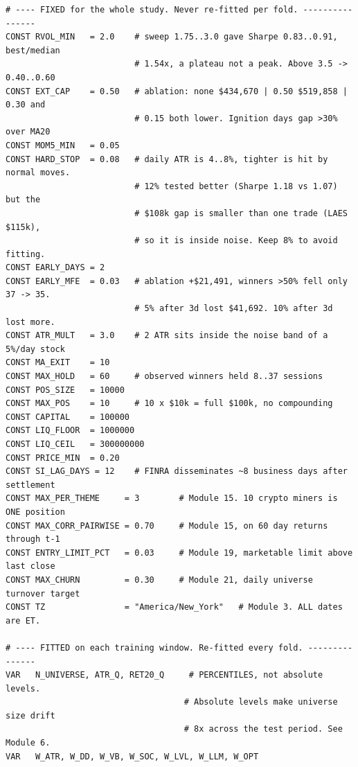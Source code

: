 \documentclass[10pt]{article}
\begin{document}
\begin{lstlisting}
# ---- FIXED for the whole study. Never re-fitted per fold. ----------------
CONST RVOL_MIN   = 2.0    # sweep 1.75..3.0 gave Sharpe 0.83..0.91, best/median
                          # 1.54x, a plateau not a peak. Above 3.5 -> 0.40..0.60
CONST EXT_CAP    = 0.50   # ablation: none $434,670 | 0.50 $519,858 | 0.30 and
                          # 0.15 both lower. Ignition days gap >30% over MA20
CONST MOM5_MIN   = 0.05
CONST HARD_STOP  = 0.08   # daily ATR is 4..8%, tighter is hit by normal moves.
                          # 12% tested better (Sharpe 1.18 vs 1.07) but the
                          # $108k gap is smaller than one trade (LAES $115k),
                          # so it is inside noise. Keep 8% to avoid fitting.
CONST EARLY_DAYS = 2
CONST EARLY_MFE  = 0.03   # ablation +$21,491, winners >50% fell only 37 -> 35.
                          # 5% after 3d lost $41,692. 10% after 3d lost more.
CONST ATR_MULT   = 3.0    # 2 ATR sits inside the noise band of a 5%/day stock
CONST MA_EXIT    = 10
CONST MAX_HOLD   = 60     # observed winners held 8..37 sessions
CONST POS_SIZE   = 10000
CONST MAX_POS    = 10     # 10 x $10k = full $100k, no compounding
CONST CAPITAL    = 100000
CONST LIQ_FLOOR  = 1000000
CONST LIQ_CEIL   = 300000000
CONST PRICE_MIN  = 0.20
CONST SI_LAG_DAYS = 12    # FINRA disseminates ~8 business days after settlement
CONST MAX_PER_THEME     = 3        # Module 15. 10 crypto miners is ONE position
CONST MAX_CORR_PAIRWISE = 0.70     # Module 15, on 60 day returns through t-1
CONST ENTRY_LIMIT_PCT   = 0.03     # Module 19, marketable limit above last close
CONST MAX_CHURN         = 0.30     # Module 21, daily universe turnover target
CONST TZ                = "America/New_York"   # Module 3. ALL dates are ET.

# ---- FITTED on each training window. Re-fitted every fold. ---------------
VAR   N_UNIVERSE, ATR_Q, RET20_Q     # PERCENTILES, not absolute levels.
                                    # Absolute levels make universe size drift
                                    # 8x across the test period. See Module 6.
VAR   W_ATR, W_DD, W_VB, W_SOC, W_LVL, W_LLM, W_OPT


\end{lstlisting}
\end{document}
